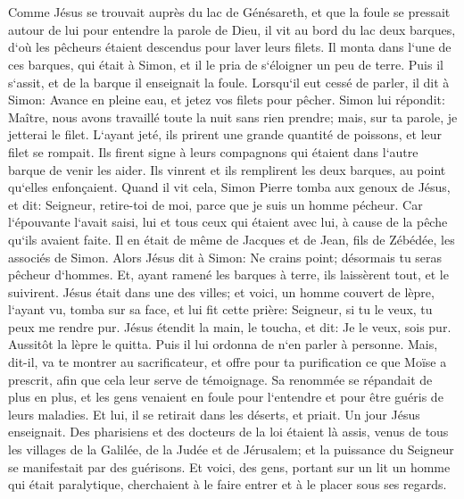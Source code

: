 \chapter{}

\verse Comme Jésus se trouvait auprès du lac de Génésareth, et que la foule se pressait autour de lui pour entendre la parole de Dieu, 
\verse il vit au bord du lac deux barques, d`où les pêcheurs étaient descendus pour laver leurs filets. 
\verse Il monta dans l`une de ces barques, qui était à Simon, et il le pria de s`éloigner un peu de terre. Puis il s`assit, et de la barque il enseignait la foule. 
\verse Lorsqu`il eut cessé de parler, il dit à Simon: Avance en pleine eau, et jetez vos filets pour pêcher. 
\verse Simon lui répondit: Maître, nous avons travaillé toute la nuit sans rien prendre; mais, sur ta parole, je jetterai le filet. 
\verse L`ayant jeté, ils prirent une grande quantité de poissons, et leur filet se rompait. 
\verse Ils firent signe à leurs compagnons qui étaient dans l`autre barque de venir les aider. Ils vinrent et ils remplirent les deux barques, au point qu`elles enfonçaient. 
\verse Quand il vit cela, Simon Pierre tomba aux genoux de Jésus, et dit: Seigneur, retire-toi de moi, parce que je suis un homme pécheur. 
\verse Car l`épouvante l`avait saisi, lui et tous ceux qui étaient avec lui, à cause de la pêche qu`ils avaient faite. 
\verse Il en était de même de Jacques et de Jean, fils de Zébédée, les associés de Simon. Alors Jésus dit à Simon: Ne crains point; désormais tu seras pêcheur d`hommes. 
\verse Et, ayant ramené les barques à terre, ils laissèrent tout, et le suivirent. 
\verse Jésus était dans une des villes; et voici, un homme couvert de lèpre, l`ayant vu, tomba sur sa face, et lui fit cette prière: Seigneur, si tu le veux, tu peux me rendre pur. 
\verse Jésus étendit la main, le toucha, et dit: Je le veux, sois pur. Aussitôt la lèpre le quitta. 
\verse Puis il lui ordonna de n`en parler à personne. Mais, dit-il, va te montrer au sacrificateur, et offre pour ta purification ce que Moïse a prescrit, afin que cela leur serve de témoignage. 
\verse Sa renommée se répandait de plus en plus, et les gens venaient en foule pour l`entendre et pour être guéris de leurs maladies. 
\verse Et lui, il se retirait dans les déserts, et priait. 
\verse Un jour Jésus enseignait. Des pharisiens et des docteurs de la loi étaient là assis, venus de tous les villages de la Galilée, de la Judée et de Jérusalem; et la puissance du Seigneur se manifestait par des guérisons. 
\verse Et voici, des gens, portant sur un lit un homme qui était paralytique, cherchaient à le faire entrer et à le placer sous ses regards. 
